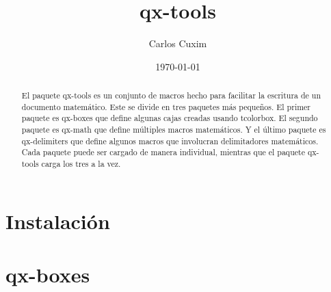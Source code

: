 \documentclass[11pt]{article}
\title{\textsf{qx-tools}}
\author{Carlos Cuxim}
\date{\today}
\begin{document}
\maketitle

\begin{abstract}
  El paquete \textsf{qx-tools} es un conjunto de macros hecho para facilitar la escritura de un documento matemático. Este se divide en tres paquetes más pequeños. El primer paquete es \textsf{qx-boxes} que define algunas cajas creadas usando \textsf{tcolorbox}. El segundo paquete es \textsf{qx-math} que define múltiples macros matemáticos. Y el último paquete es \textsf{qx-delimiters} que define algunos macros que involucran delimitadores matemáticos. Cada paquete puede ser cargado de manera individual, mientras que el paquete \textsf{qx-tools} carga los tres a la vez.
\end{abstract}



\section{Instalación}


\section{\textsf{qx-boxes}}
\end{document}
